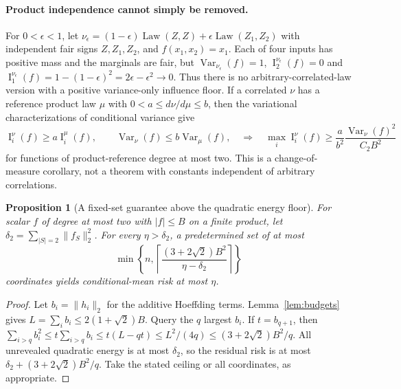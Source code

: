 \documentclass[11pt,letterpaper]{article}
\newtheorem{proposition}[theorem]{Proposition}
\theoremstyle{definition}\newtheorem{definition}[theorem]{Definition}
\newcommand{\Var}{\operatorname{Var}}
\newcommand{\Inf}{\operatorname{I}}
\newcommand{\Ctwo}{C_2}
\newcommand{\Law}{\operatorname{Law}}
\newcommand{\abs}[1]{\lvert #1\rvert}
\newcommand{\norm}[1]{\lVert #1\rVert}
\begin{document}
\paragraph{Product independence cannot simply be removed.}
For $0<\epsilon<1$, let $\nu_\epsilon=(1-\epsilon)\Law(Z,Z)+\epsilon\Law(Z_1,Z_2)$ with independent fair signs $Z,Z_1,Z_2$, and $f(x_1,x_2)=x_1$. Each of four inputs has positive mass and the marginals are fair, but $\Var_{\nu_\epsilon}(f)=1$, $\Inf^{\nu_\epsilon}_2(f)=0$ and
$\Inf^{\nu_\epsilon}_1(f)=1-(1-\epsilon)^2=2\epsilon-\epsilon^2\to0$. Thus there is no arbitrary-correlated-law version with a positive variance-only influence floor. If a correlated $\nu$ has a reference product law $\mu$ with $0<a\le d\nu/d\mu\le b$, then the variational characterizations of conditional variance give
\begin{equation}\label{eq:correlated}
\Inf_i^\nu(f)\ge a\Inf_i^\mu(f),\qquad\Var_\nu(f)\le b\Var_\mu(f),
\quad\Longrightarrow\quad \max_i\Inf_i^\nu(f)\ge\frac{a}{b^2}\frac{\Var_\nu(f)^2}{\Ctwo B^2}
\end{equation}
for functions of product-reference degree at most two. This is a change-of-measure corollary, not a theorem with constants independent of arbitrary correlations.

\begin{proposition}[A fixed-set guarantee above the quadratic energy floor]\label{prop:nonadaptive}
For scalar $f$ of degree at most two with $\abs f\le B$ on a finite product, let $\delta_2=\sum_{|S|=2}\norm{f_S}_2^2$. For every $\eta>\delta_2$, a predetermined set of at most
\begin{equation}\label{eq:fixed}
\min\left\{n,\left\lceil\frac{(3+2\sqrt2)B^2}{\eta-\delta_2}\right\rceil\right\}
\end{equation}
coordinates yields conditional-mean risk at most $\eta$.
\end{proposition}
\begin{proof}
Let $b_i=\norm{h_i}_2$ for the additive Hoeffding terms. Lemma~\ref{lem:budgets} gives $L=\sum_i b_i\le2(1+\sqrt2)B$. Query the $q$ largest $b_i$. If $t=b_{q+1}$, then $\sum_{i>q}b_i^2\le t\sum_{i>q}b_i\le t(L-qt)\le L^2/(4q)\le(3+2\sqrt2)B^2/q$. All unrevealed quadratic energy is at most $\delta_2$, so the residual risk is at most $\delta_2+(3+2\sqrt2)B^2/q$. Take the stated ceiling or all coordinates, as appropriate.
\end{proof}
\end{document}

